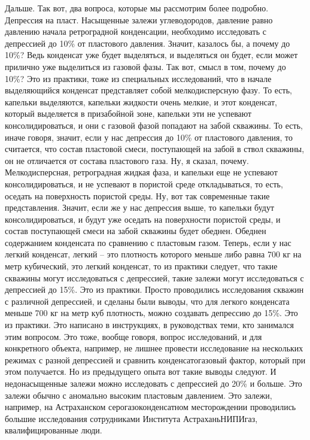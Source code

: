 \documentclass[main.tex]{subfiles}
\begin{document}
Дальше. Так вот, два вопроса, которые мы рассмотрим более подробно. Депрессия на пласт.
Насыщенные залежи углеводородов, давление равно давлению начала ретроградной конденсации, необходимо исследовать с депрессией до 10\% от пластового давления.
Значит, казалось бы, а почему до 10\%?
Ведь конденсат уже будет выделяться, и выделяться он будет, если может прилично уже выделиться из газовой фазы.
Так вот, смысл в том, почему до 10\%?
Это из практики, тоже из специальных исследований, что в начале выделяющийся конденсат представляет собой мелкодисперсную фазу.
То есть, капельки выделяются, капельки жидкости очень мелкие, и этот конденсат, который выделяется в призабойной зоне, капельки эти не успевают консолидироваться, и они с газовой фазой попадают на забой скважины. 
То есть, иначе говоря, значит, если у нас депрессия до 10\% от пластового давления, то считается, что состав пластовой смеси, поступающей на забой в ствол скважины, он не отличается от состава пластового газа.
Ну, я сказал, почему.
Мелкодисперсная, ретроградная жидкая фаза, и капельки еще не успевают консолидироваться, и не успевают в пористой среде откладываться, то есть, оседать на поверхность пористой среды.
Ну, вот так современные такие представления.
Значит, если же у нас депрессия выше, то капельки будут консолидироваться, и будут уже оседать на поверхности пористой среды, и состав поступающей смеси на забой скважины будет обеднен.
Обеднен содержанием конденсата по сравнению с пластовым газом.
Теперь, если у нас легкий конденсат, легкий -- это плотность которого меньше либо равна 700 кг на метр кубический, это легкий конденсат, то из практики следует, что такие скважины могут исследоваться с депрессией, такие залежи могут исследоваться с депрессией до 15\%.
Это из практики.
Просто проводились исследования скважин с различной депрессией, и сделаны были выводы, что для легкого конденсата меньше 700 кг на метр куб плотность, можно создавать депрессию до 15\%.
Это из практики.
Это написано в инструкциях, в руководствах теми, кто занимался этим вопросом.
Это тоже, вообще говоря, вопрос исследований, и для конкретного объекта, например, не лишнее провести исследование на нескольких режимах с разной депрессией и сравнить конденсатогазовый фактор, который при этом получается.
Но из предыдущего опыта вот такие выводы следуют.
И недонасыщенные залежи можно исследовать с депрессией до 20\% и больше.
Это залежи обычно с аномально высоким пластовым давлением.
Это залежи, например, на Астраханском серогазоконденсатном месторождении проводились большие исследования сотрудниками Института АстраханьНИПИгаз, квалифицированные люди.
\end{document}
